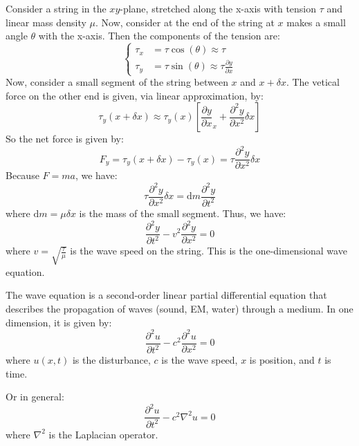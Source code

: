 \documentclass[11pt]{report}
\begin{document}
\begin{example}
    Consider a string in the $xy$-plane, stretched along the x-axis with tension \( \tau \) and linear mass density \( \mu \). Now, consider at the end of the string at $x$ makes a small angle \( \theta \) with the x-axis. Then the components of the tension are:
    $$
    \begin{cases}
        \tau_x &= \tau \cos(\theta) \approx \tau \\
        \tau_y &= \tau \sin(\theta) \approx \tau \frac{\partial y}{\partial x}
    \end{cases}
    $$
    Now, consider a small segment of the string between \( x \) and \( x + \delta x \). The vetical force on the other end is given, via linear approximation, by:
    $$    
        \tau_y(x + \delta x) \approx \tau_y(x) \left[ \frac{\partial y}{\partial x}_x + \frac{\partial^2 y}{\partial x^2} \delta x \right]
    $$
    So the net force is given by:
    $$
        F_y = \tau_y(x + \delta x) - \tau_y(x) = \tau \frac{\partial^2 y}{\partial x^2} \delta x
    $$
    Because \( F=ma \), we have:
    $$
        \tau \frac{\partial^2 y}{\partial x^2} \delta x = \text{d}m \frac{\partial^2 y}{\partial t^2}
    $$
    where \( \text{d}m = \mu \delta x \) is the mass of the small segment. Thus, we have:
    $$
        \frac{\partial^2 y}{\partial t^2} - v^2 \frac{\partial^2 y}{\partial x^2} = 0
    $$
    where \( v = \sqrt{\frac{\tau}{\mu}} \) is the wave speed on the string. This is the one-dimensional wave equation.

\end{example}
\begin{definition}
    The wave equation is a second-order linear partial differential equation that describes the propagation of waves (sound, EM, water) through a medium. In one dimension, it is given by:
    \begin{equation}\label{eq:wave_equation}
        \frac{\partial^2 u}{\partial t^2} - c^2 \frac{\partial^2 u}{\partial x^2} = 0
    \end{equation}
    where $u(x,t)$ is the disturbance, $c$ is the wave speed, $x$ is position, and $t$ is time.

    Or in general:
    $$
        \frac{\partial^2 u}{\partial t^2} - c^2 \nabla^2 u = 0
    $$
    where \( \nabla^2 \) is the Laplacian operator.
\end{definition}
\end{document}
